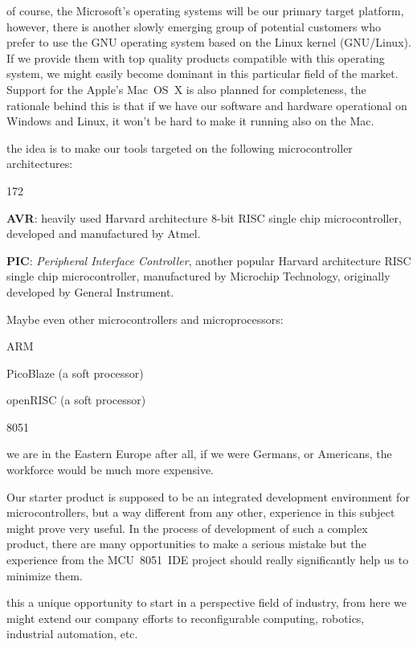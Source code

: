 \documentclass[a4paper,twoside,15pt]{book}
\begin{document}
\begin{description}
					of course, the Microsoft's operating systems will be our primary target platform, however, there is another slowly emerging group of potential customers who prefer to use the GNU operating system based on the Linux kernel (GNU/Linux). If we provide them with top quality products compatible with this operating system, we might easily become dominant in this particular field of the market. Support for the Apple's Mac~OS~X is also planned for completeness, the rationale behind this is that if we have our software and hardware operational on Windows\textregistered{} and Linux\textregistered{}, it won't be hard to make it running also on the Mac.
				\item[Target MCU architectures:]
					the idea is to make our tools targeted on the following microcontroller architectures:
					\begin{dingautolist}{172}
						\item \textbf{AVR}: heavily used Harvard architecture 8-bit RISC single chip microcontroller, developed and manufactured by Atmel.
						\item \textbf{PIC}: \textit{Peripheral Interface Controller}, another popular Harvard architecture RISC single chip microcontroller, manufactured by Microchip Technology, originally developed by General Instrument.
						\item Maybe even other microcontrollers and microprocessors:
							\begin{dinglist}{75}
								\item ARM
								\item PicoBlaze (a soft processor)
								\item openRISC (a soft processor)
								\item 8051
							\end{dinglist}
					\end{dingautolist}
				\item[Low-cost workforce:]
					we are in the Eastern Europe after all, if we were Germans, or Americans, the workforce would be much more expensive.
				\item[Experience from the MCU~8051~IDE project:]
					Our starter product is supposed to be an integrated development environment for microcontrollers, but a way different from any other, experience in this subject might prove very useful. In the process of development of such a complex product, there are many opportunities to make a serious mistake but the experience from the MCU~8051~IDE project should really significantly help us to minimize them.
				\item[We might easily expand to more perspective areas of business from this starter product:]
					this a unique opportunity to start in a perspective field of industry, from here we might extend our company efforts to reconfigurable computing, robotics, industrial automation, etc.
			\end{description}
\end{document}
